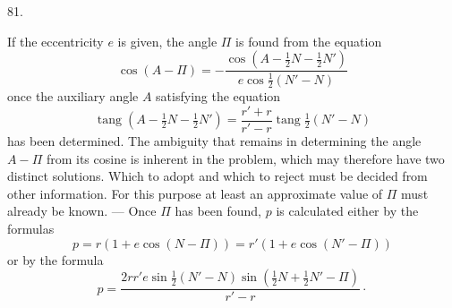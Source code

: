 \par{}\medskip
\hypertarget{native-110-article081}{}
\begin{center}81.\end{center}
If the eccentricity $e$ is given, the angle $\Pi$ is found from the equation
\[
\cos(A-\Pi)=-\frac{\cos(A-\tfrac12N-\tfrac12N')}{e\cos\tfrac12(N'-N)}
\]
once the auxiliary angle $A$ satisfying the equation
\[
\operatorname{tang}(A-\tfrac12N-\tfrac12N')=\frac{r'+r}{r'-r}\operatorname{tang}\tfrac12(N'-N)
\]
has been determined. The ambiguity that remains in determining the angle $A-\Pi$ from its cosine is inherent in the problem, which may therefore have two distinct solutions. Which to adopt and which to reject must be decided from other information. For this purpose at least an approximate value of $\Pi$ must already be known. — Once $\Pi$ has been found, $p$ is calculated either by the formulas
\[
p=r(1+e\cos(N-\Pi))=r'(1+e\cos(N'-\Pi))
\]
or by the formula
\[
p=\frac{2rr'e\sin\tfrac12(N'-N)\sin(\tfrac12N+\tfrac12N'-\Pi)}{r'-r}\mathpunct{\cdot}
\]
